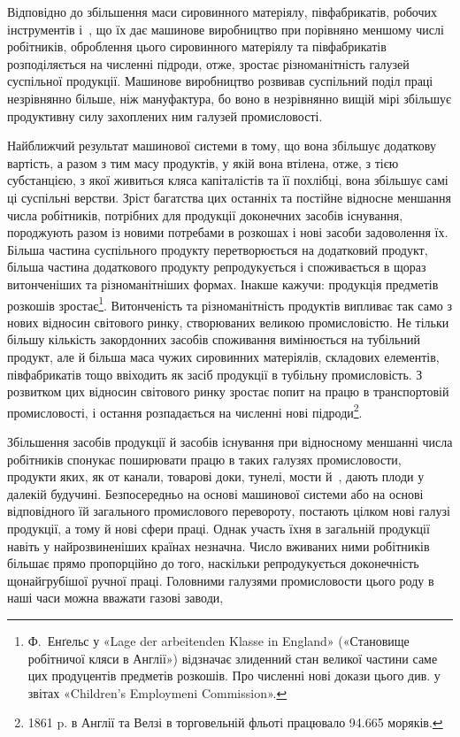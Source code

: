 
Відповідно до збільшення маси сировинного матеріялу, півфабрикатів,
робочих інструментів і~, що їх дає машинове
виробництво при порівняно меншому числі робітників,
оброблення цього сировинного матеріялу та півфабрикатів розподіляється
на численні підроди, отже, зростає різноманітність
галузей суспільної продукції. Машинове виробництво розвивав
суспільний поділ праці незрівнянно більше, ніж мануфактура,
бо воно в незрівнянно вищій мірі збільшує продуктивну силу
захоплених ним галузей промисловості.

Найближчий результат машинової системи в тому, що вона
збільшує додаткову вартість, а разом з тим масу продуктів, у
якій вона втілена, отже, з тією субстанцією, з якої живиться
кляса капіталістів та її похлібці, вона збільшує самі ці суспільні
верстви. Зріст багатства цих останніх та постійне відносне меншання
числа робітників, потрібних для продукції доконечних
засобів існування, породжують разом із новими потребами в розкошах
і нові засоби задоволення їх. Більша частина суспільного
продукту перетворюється на додатковий продукт, більша частина
додаткового продукту репродукується і споживається в щораз
витонченіших та різноманітніших формах. Інакше кажучи: продукція
предметів розкошів зростає\footnote{
Ф.~Енґельс у «Lage der arbeitenden Klasse in England» («Становище
робітничої кляси в Англії») відзначає злиденний стан великої частини
саме цих продуцентів предметів розкошів. Про численні нові докази
цього див. у звітах «Children’s Employmeni Commission».
}. Витонченість та різноманітність
продуктів випливає так само з нових відносин світового
ринку, створюваних великою промисловістю. Не тільки
більшу кількість закордонних засобів споживання вимінюється
на тубільний продукт, але й більша маса чужих сировинних матеріялів,
складових елементів, півфабрикатів тощо ввіходить
як засіб продукції в тубільну промисловість. З розвитком цих
відносин світового ринку зростає попит на працю в транспортовій
промисловості, і остання розпадається на численні нові
підроди\footnote{
1861 p. в Англії та Велзі в торговельній фльоті працювало \num{94.665}
моряків.
}.

Збільшення засобів продукції й засобів існування при відносному
меншанні числа робітників спонукає поширювати працю в
таких галузях промисловости, продукти яких, як от канали,
товарові доки, тунелі, мости й~, дають плоди у далекій будучині.
Безпосередньо на основі машинової системи або на основі
відповідного їй загального промислового перевороту, постають
цілком нові галузі продукції, а тому й нові сфери праці. Однак
участь їхня в загальній продукції навіть у найрозвиненіших
країнах незначна. Число вживаних ними робітників більшає
прямо пропорційно до того, наскільки репродукується доконечність
щонайгрубішої ручної праці. Головними галузями промисловости
цього роду в наші часи можна вважати газові заводи,
\parbreak{}  %
